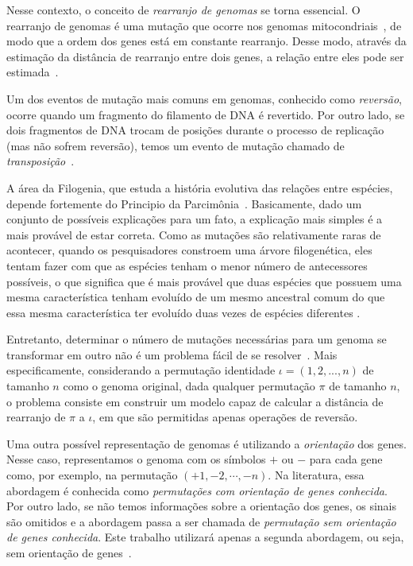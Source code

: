 \documentclass[runningheads,a4paper]{llncs}
\begin{document}
Nesse contexto, o conceito de \textit{rearranjo de genomas} se torna essencial. O rearranjo de genomas é uma mutação que ocorre nos genomas mitocondriais~\cite{Russel}, de modo que a ordem dos genes está em constante rearranjo. Desse modo, através da estimação da distância de rearranjo entre dois genes, a relação entre eles pode ser estimada~\cite{Pevzner}.

Um dos eventos de mutação mais comuns em genomas, conhecido como \textit{reversão}, ocorre quando um fragmento do filamento de DNA é revertido. Por outro lado, se dois fragmentos de DNA trocam de posições durante o processo de replicação (mas não sofrem reversão), temos um evento de mutação chamado de \textit{transposição}~\cite{daSilva}.

A área da Filogenia, que estuda a história evolutiva das relações entre espécies, depende fortemente do Principio da Parcimônia~\cite{Podani}. Basicamente, dado um conjunto de possíveis explicações para um fato, a explicação mais simples é a mais provável de estar correta. Como as mutações são relativamente raras de acontecer, quando os pesquisadores constroem uma árvore filogenética, eles tentam fazer com que as espécies tenham o menor número de antecessores possíveis, o que significa que é mais provável que duas espécies que possuem uma mesma característica tenham evoluído de um mesmo ancestral comum do que essa mesma característica ter evoluído duas vezes de espécies diferentes \cite{daSilva}.

Entretanto, determinar o número de mutações necessárias para um genoma se transformar em outro não é um problema fácil de se resolver~\cite{daSilva}. Mais especificamente, considerando a permutação identidade $\iota = (1,2,...,n)$ de tamanho $n$ como o genoma original, dada qualquer permutação $\pi$ de tamanho $n$, o problema consiste em construir um modelo capaz de calcular a distância de rearranjo de $\pi$ a $\iota$, em que são permitidas apenas operações de reversão.

Uma outra possível representação de genomas é utilizando a \textit{orientação} dos genes. Nesse caso, representamos o genoma com os símbolos $+$ ou $-$ para cada gene como, por exemplo, na permutação $(+1,-2,\cdots,-n)$. Na literatura, essa abordagem é conhecida como \textit{permutações com orientação de genes conhecida}. Por outro lado, se não temos informações sobre a orientação dos genes, os sinais são omitidos e a abordagem passa a ser chamada de \textit{permutação sem orientação de genes conhecida}. Este trabalho utilizará apenas a segunda abordagem, ou seja, sem orientação de genes~\cite{Setubal}. 
\end{document}
